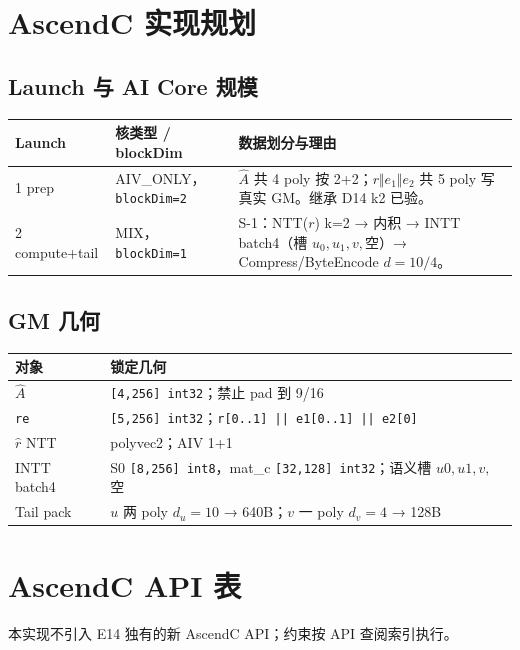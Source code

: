 \documentclass[UTF8,a4paper,11pt]{ctexart}
\begin{document}
\section{AscendC 实现规划}

\subsection{Launch 与 AI Core 规模}

\begin{longtable}{@{}L{2.5cm}L{3.0cm}L{7.6cm}@{}}
\toprule
Launch & 核类型 / blockDim & 数据划分与理由 \\
 prep & AIV\_ONLY，\texttt{blockDim=2} & \(\hat A\) 共 4 poly 按 2+2；$r\Vert e_1\Vert e_2$ 共 5 poly 写真实 GM。继承 D14 k2 已验。 \\
2 compute+tail & MIX，\texttt{blockDim=1} & S-1：NTT(\(r\)) k=2 → 内积 → INTT batch4（槽 \(u_0,u_1,v,\)空）→ Compress/ByteEncode \(d=10/4\)。 \\
\bottomrule
\end{longtable}

\subsection{GM 几何}

\begin{longtable}{@{}L{3.7cm}L{9.5cm}@{}}
\toprule
对象 & 锁定几何 \\
\midrule
\(\hat A\) & \texttt{[4,256] int32}；禁止 pad 到 9/16 \\
\texttt{re} & \texttt{[5,256] int32}；\texttt{r[0..1] || e1[0..1] || e2[0]} \\
\(\hat r\) NTT & polyvec2；AIV 1+1 \\
INTT batch4 & S0 \texttt{[8,256] int8}，mat\_c \texttt{[32,128] int32}；语义槽 \(u0,u1,v,\)空 \\
Tail pack & \(u\) 两 poly \(d_u=10\) → 640B；\(v\) 一 poly \(d_v=4\) → 128B \\
\bottomrule
\end{longtable}

\section{AscendC API 表}

本实现不引入 E14 独有的新 AscendC API；约束按 API 查阅索引执行。
\end{document}

